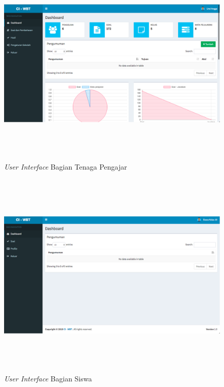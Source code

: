 \documentclass{scrreprt}
\begin{document}
		\begin{figure}
			\includegraphics[width=17cm, height=10cm]{tenaga-pengajar.png}
			\caption{\emph{User Interface} Bagian Tenaga Pengajar}
		\end{figure}				

		\begin{figure}
			\includegraphics[width=17cm, height=10cm]{siswa.png}
			\caption{\emph{User Interface} Bagian Siswa}
		\end{figure}

	
\end{document}
